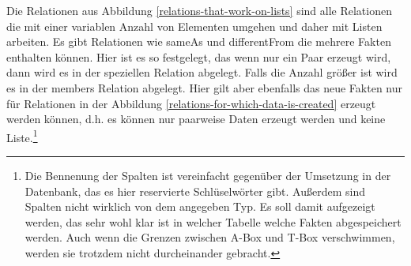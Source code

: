 Die Relationen aus Abbildung \ref{relations-that-work-on-lists} sind alle Relationen die mit einer variablen Anzahl von Elementen umgehen und daher mit Listen arbeiten. Es gibt Relationen wie sameAs und differentFrom die mehrere Fakten enthalten können. Hier ist es so festgelegt, das wenn nur ein Paar erzeugt wird, dann wird es in der speziellen Relation abgelegt. Falls die Anzahl größer ist wird es in der members Relation abgelegt. Hier gilt aber ebenfalls das neue Fakten nur für Relationen in der Abbildung \ref{relations-for-which-data-is-created} erzeugt werden können, d.h. es können nur paarweise Daten erzeugt werden und keine Liste.\footnote{Die Bennenung der Spalten ist vereinfacht gegenüber der Umsetzung in der Datenbank, das es hier reservierte Schlüselwörter gibt. Außerdem sind Spalten nicht wirklich von dem angegeben Typ. Es soll damit aufgezeigt werden, das sehr wohl klar ist in welcher Tabelle welche Fakten abgespeichert werden. Auch wenn die Grenzen zwischen A-Box und T-Box verschwimmen, werden sie trotzdem nicht durcheinander gebracht.}

